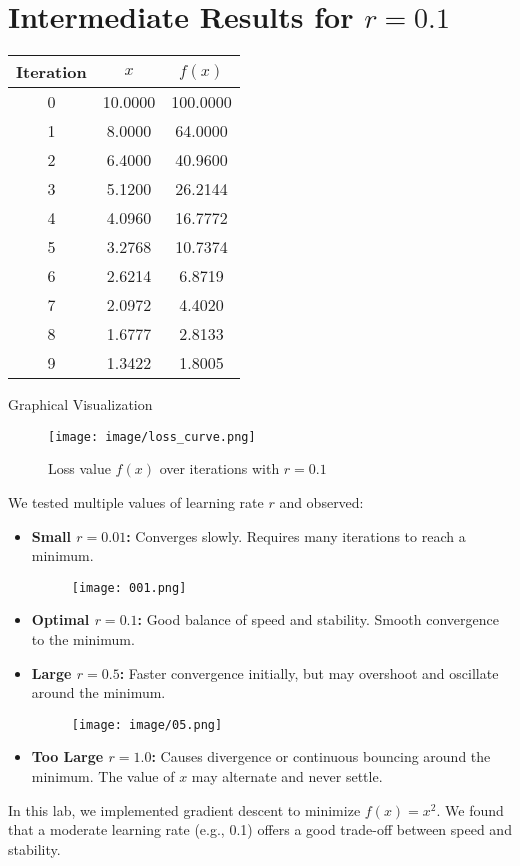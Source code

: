 \documentclass[hidelinks]{report}
\begin{document}
\chapter{Intermediate Results for $r = 0.1$}

\begin{center}
\begin{tabular}{|c|c|c|}
\hline
Iteration & $x$ & $f(x)$ \\
\hline
0 & 10.0000 & 100.0000 \\
1 & 8.0000 & 64.0000 \\
2 & 6.4000 & 40.9600 \\
3 & 5.1200 & 26.2144 \\
4 & 4.0960 & 16.7772 \\
5 & 3.2768 & 10.7374 \\
6 & 2.6214 & 6.8719 \\
7 & 2.0972 & 4.4020 \\
8 & 1.6777 & 2.8133 \\
9 & 1.3422 & 1.8005 \\
\hline
\end{tabular}
\end{center}

Graphical Visualization

\begin{figure}[H]
    \centering
    \texttt{[image: image/loss\_curve.png]}
    \caption{Loss value $f(x)$ over iterations with $r = 0.1$}
\end{figure}

We tested multiple values of learning rate \( r \) and observed:

\begin{itemize}
    \item \textbf{Small \( r = 0.01 \):}  
    Converges slowly. Requires many iterations to reach a minimum.
\begin{figure}[H]
    \centering
    \texttt{[image: 001.png]}
    \label{fig:enter-label}
\end{figure}
    \item \textbf{Optimal \( r = 0.1 \):}  
    Good balance of speed and stability. Smooth convergence to the minimum.

    \item \textbf{Large \( r = 0.5 \):}  
    Faster convergence initially, but may overshoot and oscillate around the minimum.
\begin{figure}[H]
    \centering
    \texttt{[image: image/05.png]}
\end{figure}
    \item \textbf{Too Large \( r = 1.0 \):}  
    Causes divergence or continuous bouncing around the minimum. The value of \( x \) may alternate and never settle.
    
\end{itemize}
In this lab, we implemented gradient descent to minimize \( f(x) = x^2 \). We found that a moderate learning rate (e.g., 0.1) offers a good trade-off between speed and stability.
\end{document}
